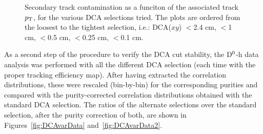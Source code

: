 \begin{figure}[h]
 \caption{Secondary track contamination as a funciton of the associated track $p_{\rm T}$, for the various DCA selections tried. The plots are ordered from the loosest to the tightest selection, i.e.: DCA($xy$) $<$2.4 cm, $<$1 cm, $<$0.5 cm, $<$0.25 cm, $<$0.1 cm.}
 \label{fig:DCAvar}
\end{figure}

As a second step of the procedure to verify the DCA cut stability, the ${\rm D^0}$-h data analysis was performed with all the different DCA selection (each time with the proper tracking efficiency map). After having extracted the correlation distributions, these were rescaled (bin-by-bin) for the corresponding purities and compared with the purity-corrected correlation distributions obtained with the standard DCA selection.
The ratios of the alternate selections over the standard selection, after the purity correction of both, are shown in Figures~\ref{fig:DCAvarData} and~\ref{fig:DCAvarData2}.


